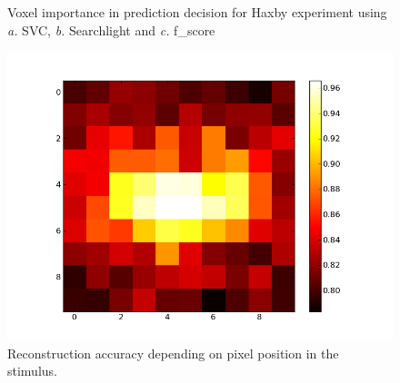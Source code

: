 \documentclass{frontiersSCNS} %
\begin{document}
\begin{figure}[h]
  \begin{center}
  \end{center}
\caption{Voxel importance in prediction decision for Haxby experiment
using \textit{a.} SVC, \textit{b.} Searchlight and \textit{c.}
f\_score}
\label{fig:haxby}
\end{figure}
\begin{figure}[h]
  \begin{center}
    \includegraphics[width=.3\linewidth]{img/logistic_l1_scores.png}
  \end{center}
  \caption{Reconstruction accuracy depending on pixel
           position in the stimulus.}
\label{fig:omp}
\end{figure}
\end{document}
